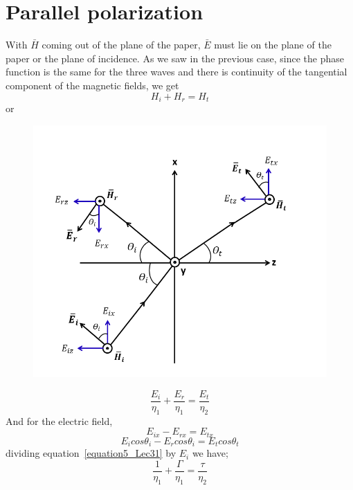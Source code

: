 \section{Parallel polarization}
With $\bar{H}$ coming out of the plane of the paper, $\bar{E}$ must lie on the plane of the paper or the plane of incidence. As we saw in the previous case, since the phase function is the same for the three waves and there is continuity of the tangential component of the magnetic fields, we get
\begin{equation*}
	H_{i} + H_{r} = H_{t}
\end{equation*}
 or
\begin{figure}[h]
\centering
\includegraphics[width=1.2\linewidth]{./graphics/parallel_polarization1}
\caption{}
\label{fig:15}
\end{figure}
\begin{equation}
\frac{E_{i}}{\eta_{1}} + \frac{E_{r}}{\eta_{1}} = \frac{E_{t}}{\eta_{2}}
\label{equation5_Lec31}
\end{equation}
And for the electric field,
\begin{equation*}
	E_{ix} - E_{rx} = E_{tx}
\end{equation*}
\begin{equation}
E_{i} cos\theta_{i} - E_{r} cos\theta_{i} = E_{t} cos\theta_{t}
\label{equation6_Lec31}
\end{equation}
dividing equation~\ref{equation5_Lec31} by $E_{i}$ we have;
\begin{equation}
\frac{1}{\eta_{1}} + \frac{\Gamma}{\eta_{1}} = \frac{\tau}{\eta_{2}}
\label{equation7_Lec31}
\end{equation}
